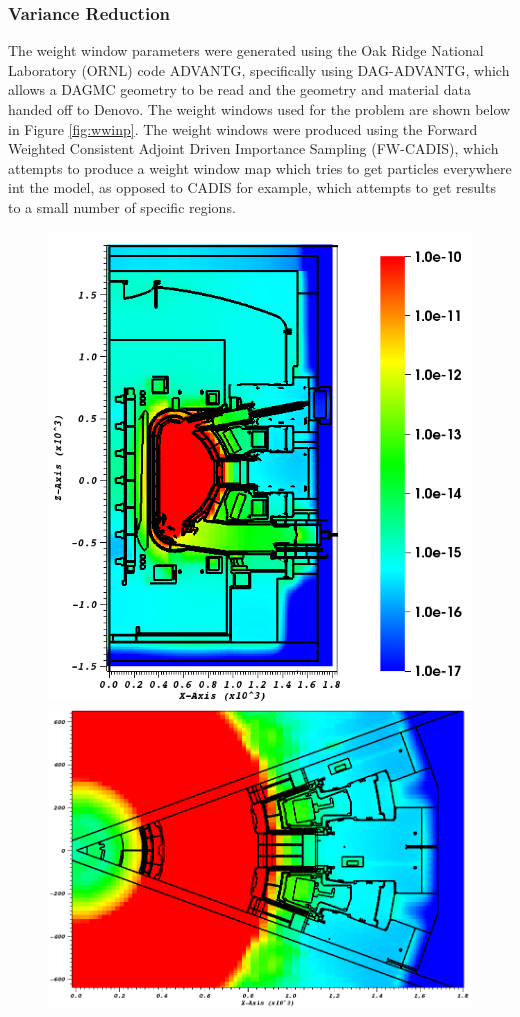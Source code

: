 \documentclass[12pt]{article}
\begin{document}
\subsubsection{Variance Reduction}
The weight window parameters were generated using the Oak Ridge National
Laboratory (ORNL) code ADVANTG, specifically using DAG-ADVANTG, which allows a
DAGMC geometry to be read and the geometry and material data handed off to
Denovo. The weight windows used for the problem are shown below in Figure
\ref{fig:wwinp}. The weight windows were produced using the Forward Weighted
Consistent Adjoint Driven Importance Sampling (FW-CADIS), which attempts to
produce a weight window map which tries to get particles everywhere int the
model, as opposed to CADIS for example, which attempts to get results to a
small number of specific regions.
\begin{figure}[ht!]
  \centering
  \includegraphics[scale=0.4]{../plots/wwinp/wwinp_y0.png}
  \includegraphics[scale=0.3]{../plots/wwinp/wwinp_z0.png}

\end{figure}
\end{document}
